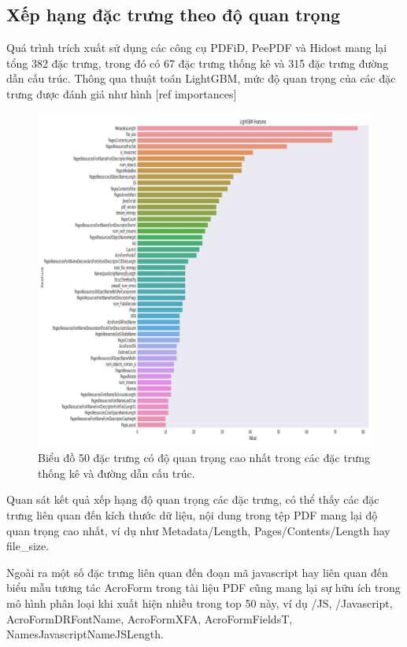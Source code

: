 \documentclass[./../main.tex]{subfiles}
\begin{document}
\subsection{Xếp hạng đặc trưng theo độ quan trọng}
Quá trình trích xuất sử dụng các công cụ PDFiD, PeePDF và Hidost mang lại tổng 382 đặc trưng, trong đó có 67 đặc trưng thống kê và 315 đặc trưng đường dẫn cấu trúc. Thông qua thuật toán LightGBM, mức độ quan trọng của các đặc trưng được đánh giá như hình [ref importances]

\begin{figure}[H]
	\centering
	\includegraphics[width=\linewidth]{./images/lgbm_importances-01.png}
	\caption{Biểu đồ 50 đặc trưng có độ quan trọng cao nhất trong các đặc trưng thống kê và đường dẫn cấu trúc.}
	\label{fig:lgbm_importances-01}
\end{figure}

Quan sát kết quả xếp hạng độ quan trọng các đặc trưng, có thể thấy các đặc trưng liên quan đến kích thước dữ liệu, nội dung trong tệp PDF mang lại độ quan trọng cao nhất, ví dụ như Metadata\slash Length, Pages\slash Contents\slash Length hay file\_size.

Ngoài ra một số đặc trưng liên quan đến đoạn mã javascript hay liên quan đến biểu mẫu tương tác AcroForm trong tài liệu PDF cũng mang lại sự hữu ích trong mô hình phân loại khi xuất hiện nhiều trong top 50 này, ví dụ \slash JS, \slash Javascript, AcroFormDRFontName, AcroFormXFA, AcroFormFieldsT, NamesJavascriptNameJSLength.
\end{document}
